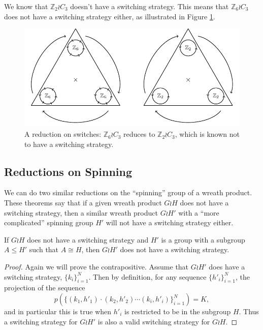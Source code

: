 \begin{example}
  We know that $\mathbb Z_2 \wr C_3$ doesn't have a switching strategy.
  This means that $\mathbb Z_6 \wr C_3$ does not have a switching strategy either,
  as illustrated in Figure \ref{fig:Z2C3}.
  \begin{figure}
    \center
    \includegraphics{assets/tikz_Z2C3.pdf}
    \caption{
      A reduction on switches:
      $\mathbb Z_6 \wr C_3$ reduces to $\mathbb Z_2 \wr C_3$,
      which is known not to have a switching strategy.
    }
    \label{fig:Z2C3}
  \end{figure}
\end{example}
\subsection{Reductions on Spinning}
We can do two similar reductions on the ``spinning'' group of a wreath product.
These theorems say that if a given wreath product $G \wr H$ does not have a
switching strategy, then a similar wreath product $G \wr H'$ with a
``more complicated'' spinning group $H'$ will not have a switching strategy
either.
\begin{theorem}
  If $G \wr H$ does not have a switching strategy and $H'$ is a group with
  a subgroup $A \leq H'$ such that $A \cong H$, then
  $G \wr H'$ does not have a switching strategy.
  \label{thm:SpinReduction}
\end{theorem}
\begin{proof}
  Again we will prove the contrapositive.
  Assume that $G \wr H'$ does have a switching strategy,
  $\{k_i\}_{i=1}^N$. Then by definition, for any sequence
  $\{h'_i\}_{i=1}^N$, the projection of the sequence \[
    p(\{(k_1, h'_1)\cdot(k_2, h'_2)\cdots(k_i, h'_i)\}_{i=1}^N) = K,
  \] and in particular this is true when $h'_i$ is restricted to be in the
  subgroup $H$. Thus a switching strategy for $G \wr H'$ is also a valid
  switching strategy for $G \wr H$.
\end{proof}

